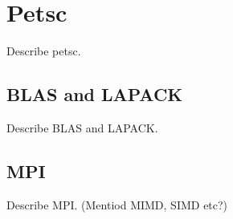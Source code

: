 \section*{Petsc}

Describe petsc.

\subsection*{BLAS and LAPACK}

Describe BLAS and LAPACK.

\subsection*{MPI}

Describe MPI. (Mentiod MIMD, SIMD etc?)
